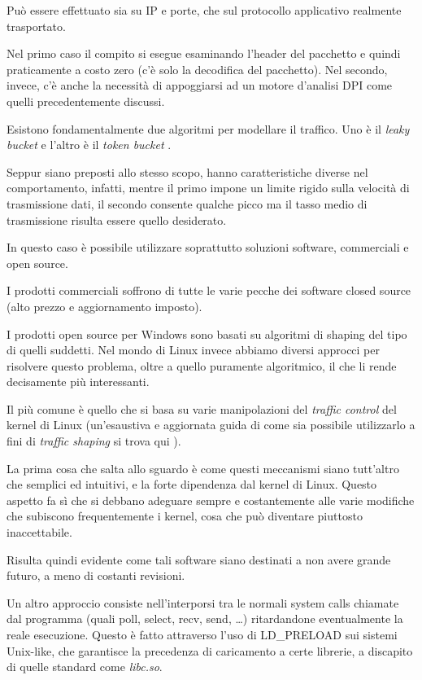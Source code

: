 Può essere effettuato sia su IP e porte, che sul protocollo applicativo realmente trasportato.

Nel primo caso il compito si esegue esaminando l'header del pacchetto e quindi praticamente a costo zero (c'è solo la decodifica del pacchetto). Nel secondo, invece, c'è anche la necessità di appoggiarsi ad un motore d'analisi DPI come quelli precedentemente discussi.

Esistono fondamentalmente due algoritmi per modellare il traffico. Uno è il \emph{leaky bucket} \cite{lba} e l'altro è il \emph{token bucket} \cite{tba}.

Seppur siano preposti allo stesso scopo, hanno caratteristiche diverse nel comportamento, infatti, mentre il primo impone un limite rigido sulla velocità di trasmissione dati, il secondo consente qualche picco ma il tasso medio di trasmissione risulta essere quello desiderato.

In questo caso è possibile utilizzare soprattutto soluzioni software, commerciali e open source.

I prodotti commerciali soffrono di tutte le varie pecche dei software closed source (alto prezzo e aggiornamento imposto).

I prodotti open source per Windows sono basati su algoritmi di shaping del tipo di quelli suddetti. Nel mondo di Linux invece abbiamo diversi approcci per risolvere questo problema, oltre a quello puramente algoritmico, il che li rende decisamente più interessanti.

Il più comune è quello che si basa su varie manipolazioni del \emph{traffic control} del kernel di Linux \cite{lntc} (un'esaustiva e aggiornata guida di come sia possibile utilizzarlo a fini di \emph{traffic shaping} si trova qui \cite{lartc}).

La prima cosa che salta allo sguardo è come questi meccanismi siano tutt'altro che semplici ed intuitivi, e la forte dipendenza dal kernel di Linux. Questo aspetto fa sì che si debbano adeguare sempre e costantemente alle varie modifiche che subiscono frequentemente i kernel, cosa che può diventare piuttosto inaccettabile.

Risulta quindi evidente come tali software siano destinati a non avere grande futuro, a meno di costanti revisioni.

Un altro approccio consiste nell'interporsi tra le  normali system calls chiamate dal programma (quali poll, select, recv, send, \dots) ritardandone eventualmente la reale esecuzione. Questo è fatto attraverso l'uso di LD\_PRELOAD sui sistemi Unix-like, che garantisce la precedenza di caricamento a certe librerie, a discapito di quelle standard come \emph{libc.so}.

